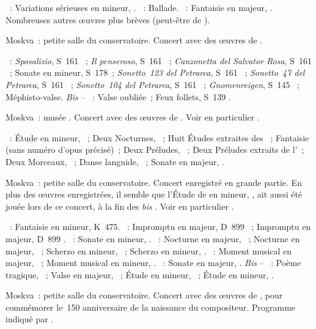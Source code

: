 \begin{description}
 \textsc{\Mendelssohn{}}~: Variations sérieuses en \kD mineur, .
 \textsc{\Brahms{}}~: Ballade.
 \textsc{\Schumann{}}~: Fantaisie en \kC majeur, .
 Nombreuses autres œuvres plus brèves (peut-être de \Schumann{}).
 \item[\DateWithWeekDay{1960-04-23}]
 Moskva~: petite salle du conservatoire.
 Concert avec des œuvres de \Liszt{}.

 \textsc{\Liszt{}}~: \emph{Sposalizio}, S~161 ~; \emph{Il
 penseroso}, S~161 ~; \emph{Canzonetta del Salvator Rosa}, S~161
 ~; Sonate en \kB mineur, S~178~; \emph{Sonetto~123 del Petrarca},
 S~161 ~; \emph{Sonetto~47 del Petrarca}, S~161 ~;
 \emph{Sonetto~104 del Petrarca}, S~161 ~; \emph{Gnomenreigen},
 S~145 ~; Méphisto-valse.
 \emph{Bis} \citep[selon][p.~184]{Nekrasova08} -- \textsc{\Liszt{}}~: Valse
 oubliée~; Feux follets, S~139 .
 \item[\DateWithWeekDay{1960-04-27}]
 Moskva~: musée \Scriabine{}.
 Concert avec des œuvres de \Scriabine{}.
 Voir en particulier \citet[p.~372-376]{Panarine}.

 \textsc{\Scriabine{}}~: Étude en \kC \Sharp mineur,  ~;
 Deux Nocturnes, ~; Huit Études extraites des ~;
 Fantaisie (sans numéro d'opus précisé)~; Deux Préludes, ~; Deux
 Préludes extraits de l'~; Deux Morceaux, ~; Danse
 languide,  ~; Sonate en \kF \Sharp majeur, .
 \item[\DateWithWeekDay{1960-05-13}]
 Moskva~: petite salle du conservatoire.
 Concert enregistré en grande partie.
 En plus des œuvres enregistrées, il semble que l'\hbox{Étude} de
 \Scriabine{} en \kD \Sharp mineur,  , ait aussi été
 jouée lors de ce concert, à la fin des \emph{bis} \citep[p.~69]{White}.
 Voir en particulier \citet[p.~447]{Milshteyn82a}.

 \textsc{\Mozart{}}~: Fantaisie en \kC mineur, K~475.
 \textsc{\Schubert{}}~: Impromptu en \kG \Flat majeur, D~899 ~;
 Impromptu en \kA \Flat majeur, D~899 .
 \textsc{\Schumann{}}~: Sonate en \kF \Sharp mineur, .
 \textsc{\Chopin{}}~: Nocturne en \kF \Sharp majeur,  ~;
 Nocturne en \kF majeur,  ~; Scherzo en \kB mineur,
 ~; Scherzo en \kB \Flat mineur, .
 \textsc{\Rachmaninov{}}~: Moment musical en \kD \Flat majeur, 
 ~; Moment musical en \kE \Flat mineur,  .
 \textsc{\Scriabine{}}~: Sonate en \kF \Sharp majeur, .
 \emph{Bis} -- \textsc{\Scriabine{}}~: Poème tragique, ~; Valse en
 \kA \Flat majeur, ~; Étude en \kB \Flat mineur, 
 ~; Étude en \kD \Sharp mineur,  .
 \item[\DateWithWeekDay{1960-05-23}]
 Moskva~: petite salle du conservatoire.
 Concert avec des œuvres de \Chopin{}, pour commémorer le~150\ieme{}
 anniversaire de la naissance du compositeur.
 Programme indiqué par \citet[p.~185]{Nekrasova08}.


\end{description}
